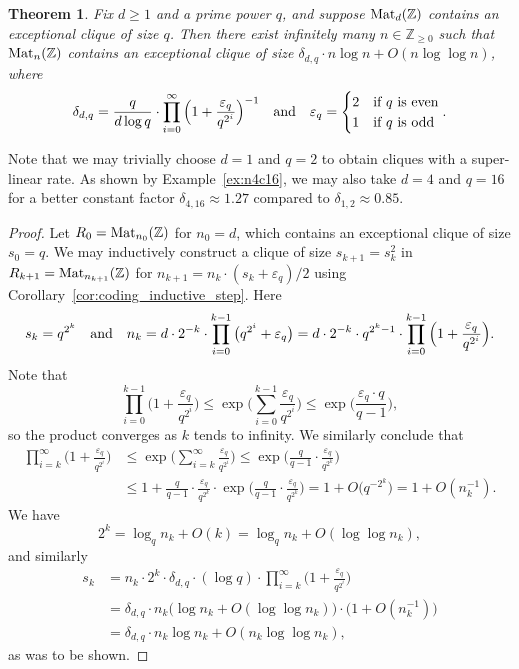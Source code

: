 \documentclass{amsart}
\theoremstyle{plain}
\newtheorem{theorem}{Theorem}[section]
\theoremstyle{definition}
\newcommand{\Z}{\ensuremath{\mathbb{Z}}}
\begin{document}
\begin{theorem}\label{thm:coding}
	Fix \(d\geq1\) and a prime power \(q\), and suppose \(\textup{Mat}_d(\Z)\) contains an exceptional clique of size \(q\).
	Then there exist infinitely many \(n\in\Z_{\geq 0}\) such that \(\textup{Mat}_n(\Z)\) contains an exceptional clique of size \(\delta_{d,q}\cdot n \log n + O(n\log\log n)\), where 
	\[\delta_{d,q} = \frac{q}{d\log q}\cdot \prod_{i=0}^\infty \Big(1+\frac{\varepsilon_q}{q^{2^i}}\Big)^{-1} \quad\textup{and}\quad \varepsilon_q = \begin{cases} 2 & \textup{if \(q\) is even}\\ 1 & \textup{if \(q\) is odd}\end{cases}.\]
\end{theorem}

Note that we may trivially choose \(d=1\) and \(q=2\) to obtain cliques with a super-linear rate.
As shown by Example~\ref{ex:n4c16}, we may also take \(d=4\) and \(q=16\) for a better constant factor \(\delta_{4,16}\approx 1.27\) compared to \(\delta_{1,2}\approx0.85\). 

\begin{proof}
	Let \(R_0=\textup{Mat}_{n_0}(\Z)\) for \(n_0=d\), which contains an exceptional clique of size \(s_0=q\).
	We may inductively construct a clique of size \(s_{k+1}=s_k^2\) in \(R_{k+1}=\textup{Mat}_{n_{k+1}}(\Z)\) for \(n_{k+1}=n_k\cdot (s_k+\varepsilon_q)/2\) using Corollary~\ref{cor:coding_inductive_step}.
	Here
	\[s_{k}=q^{2^{k}}\quad\textup{and}\quad n_{k}=d\cdot2^{-k}\cdot \prod_{i=0}^{k-1}\big(q^{2^i}+\varepsilon_q\big) = d \cdot 2^{-k}\cdot q^{2^k-1} \cdot \prod_{i=0}^{k-1} \Big(1+\frac{\varepsilon_q}{q^{2^i}}\Big). \]
	Note that
	\[\prod_{i=0}^{k-1} \Big(1+\frac{\varepsilon_q}{q^{2^i}}\Big)\leq \exp\Big( \sum_{i=0}^{k-1}\frac{\varepsilon_q}{q^{2^i}} \Big) \leq \exp\Big(\frac{\varepsilon_q\cdot q}{q-1}\Big),\]
	so the product converges as \(k\) tends to infinity.
	We similarly conclude that
	\begin{align*} 
		\prod_{i=k}^\infty \Big(1+\frac{\varepsilon_q}{q^{2^i}}\Big) 
		&\leq \exp\Big(\sum_{i=k}^\infty \frac{\varepsilon_q}{q^{2^i}} \Big) \leq \exp\Big( \frac{q}{q-1} \cdot \frac{\varepsilon_q}{q^{2^k}} \Big) \\ 
		&\leq 1 + \frac{q}{q-1} \cdot \frac{\varepsilon_q}{q^{2^k}} \cdot\exp\Big(\frac{q}{q-1} \cdot \frac{\varepsilon_q}{q^{2^k}}\Big) = 1+O\big(q^{-2^k}\big) = 1 + O(n_k^{-1}).
	\end{align*}
	We have
	\[2^k = \log_q n_k + O(k) = \log_q n_k + O(\log\log n_k),\]
	and similarly
	\begin{align*}
		s_k &=  n_k\cdot  2^k \cdot \delta_{d,q} \cdot (\log q) \cdot \prod_{i=k}^{\infty}\Big(1+\frac{\varepsilon_q}{q^{2^i}}\Big) \\ 
		&= \delta_{d,q} \cdot n_k \big(\log n_k + O(\log\log n_k) \big) \cdot \big(1+O(n_k^{-1})\big) \\
		&= \delta_{d,q} \cdot n_k \log n_k + O(n_k\log\log n_k),
	\end{align*}
	as was to be shown.
\end{proof}
\end{document}
